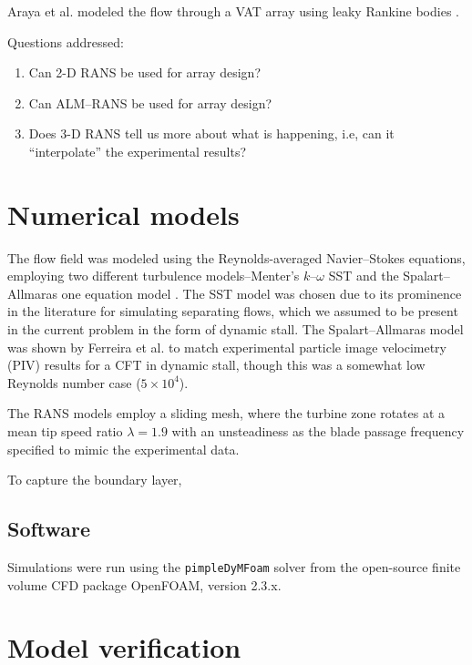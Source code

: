 \documentclass[aip,graphicx]{revtex4-1}
\begin{document}
Araya et al. modeled the flow through a VAT array using leaky Rankine bodies
\cite{Araya2014}.

Questions addressed:

\begin{enumerate}

    \item Can 2-D RANS be used for array design?
    
    \item Can ALM--RANS be used for array design?

    \item Does 3-D RANS tell us more about what is happening, i.e, can it
    ``interpolate'' the experimental results?

\end{enumerate}

\section{Numerical models}

The flow field was modeled using the Reynolds-averaged Navier--Stokes equations,
employing two different turbulence models--Menter's $k$--$\omega$ SST
\cite{Menter1994} and the Spalart--Allmaras one equation model
\cite{Spalart1992}. The SST model was chosen due to its prominence in the
literature for simulating separating flows, which we assumed to be present in
the current problem in the form of dynamic stall. The Spalart--Allmaras model
was shown by Ferreira et al. \cite{Ferreira2007} to match experimental particle
image velocimetry (PIV) results for a CFT in dynamic stall, though this was a
somewhat low Reynolds number case ($5 \times 10^4$).

The RANS models employ a sliding mesh, where the turbine zone rotates at a mean
tip speed ratio $\lambda=1.9$ with an unsteadiness as the blade passage
frequency specified to mimic the experimental data.

To capture the boundary layer, 

\subsection{Software}

Simulations were run using the \texttt{pimpleDyMFoam} solver from the
open-source finite volume CFD package OpenFOAM, version 2.3.x.

\section{Model verification}
\end{document}
